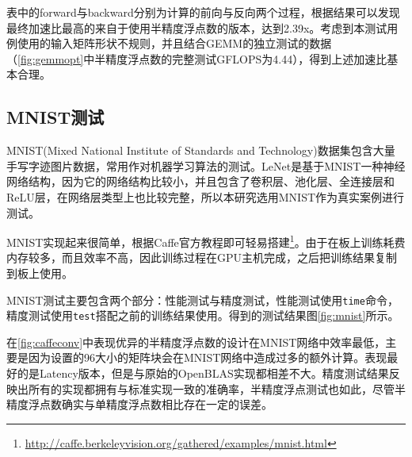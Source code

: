 表中的forward与backward分别为计算的前向与反向两个过程，根据结果可以发现最终加速比最高的来自于使用半精度浮点数的版本，达到2.39x。考虑到本测试用例使用的输入矩阵形状不规则，并且结合GEMM的独立测试的数据（\ref{fig:gemmopt}中半精度浮点数的完整测试GFLOPS为4.44），得到上述加速比基本合理。

\subsection{MNIST测试}

MNIST(Mixed National Institute of Standards and Technology)数据集包含大量手写字迹图片数据，常用作对机器学习算法的测试。LeNet\supercite{lecun1998gradient}是基于MNIST一种神经网络结构，因为它的网络结构比较小，并且包含了卷积层、池化层、全连接层和ReLU层，在网络层类型上也比较完整，所以本研究选用MNIST作为真实案例进行测试。

MNIST实现起来很简单，根据Caffe官方教程即可轻易搭建\footnote{\url{http://caffe.berkeleyvision.org/gathered/examples/mnist.html}}。由于在板上训练耗费内存较多，而且效率不高，因此训练过程在GPU主机完成，之后把训练结果复制到板上使用。

MNIST测试主要包含两个部分：性能测试与精度测试，性能测试使用\texttt{time}命令，精度测试使用\texttt{test}搭配之前的训练结果使用。得到的测试结果图\ref{fig:mnist}所示。

在\ref{fig:caffeconv}中表现优异的半精度浮点数的设计在MNIST网络中效率最低，主要是因为设置的96大小的矩阵块会在MNIST网络中造成过多的额外计算。表现最好的是Latency版本，但是与原始的OpenBLAS实现都相差不大。精度测试结果反映出所有的实现都拥有与标准实现一致的准确率，半精度浮点测试也如此，尽管半精度浮点数确实与单精度浮点数相比存在一定的误差。

